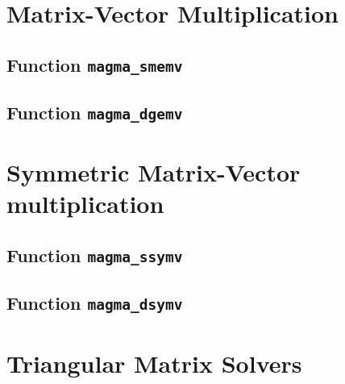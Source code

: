 \documentclass[10pt]{book}
\begin{document}
\section{Matrix-Vector Multiplication}
\newpage
\subsection{Function {\tt {\bf magma\_smemv}}}
\newpage
\subsection{Function {\tt {\bf magma\_dgemv}}}

\newpage
\section{Symmetric Matrix-Vector multiplication}
\newpage
\subsection{Function {\tt {\bf magma\_ssymv}}}
\newpage
\subsection{Function {\tt {\bf magma\_dsymv}}}

\newpage
\section{Triangular Matrix Solvers}

\newpage
\end{document}
